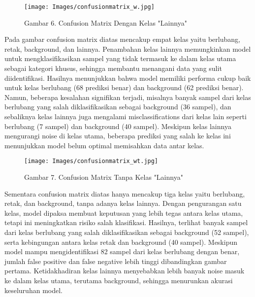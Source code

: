 \documentclass[12pt,a4paper]{article}
\begin{document}
\begin{figure}[h]
    \centering
    \texttt{[image: Images/confusionmatrix\_w.jpg]}
    \caption*{Gambar 6. Confusion Matrix Dengan Kelas "Lainnya"}
    \label{fig:enter-label}
\end{figure}
\begin{adjustwidth}{3em}{0pt}
\hspace{0.5cm} Pada gambar confusion matrix diatas mencakup empat kelas yaitu berlubang, retak, background, dan lainnya. Penambahan kelas lainnya memungkinkan model untuk mengklasifikasikan sampel yang tidak termasuk ke dalam kelas utama sebagai kategori khusus, sehingga membantu menangani data yang sulit diidentifikasi. Hasilnya menunjukkan bahwa model memiliki performa cukup baik untuk kelas berlubang (68 prediksi benar) dan background (62 prediksi benar). Namun, beberapa kesalahan signifikan terjadi, misalnya banyak sampel dari kelas berlubang yang salah diklasifikasikan sebagai background (36 sampel), dan sebaliknya kelas lainnya juga mengalami misclassifications dari kelas lain seperti berlubang (7 sampel) dan background (40 sampel). Meskipun kelas lainnya mengurangi noise di kelas utama, beberapa prediksi yang salah ke kelas ini menunjukkan model belum optimal memisahkan data antar kelas.
\end{adjustwidth}

\begin{figure}[h]
    \centering
    \texttt{[image: Images/confusionmatrix\_wt.jpg]}
    \caption*{Gambar 7. Confusion Matrix Tanpa Kelas "Lainnya"}
    \label{fig:enter-label}
\end{figure}
\begin{adjustwidth}{3em}{0pt}
\hspace{0.5cm} Sementara confusion matrix diatas hanya mencakup tiga kelas yaitu berlubang, retak, dan background, tanpa adanya kelas lainnya. Dengan pengurangan satu kelas, model dipaksa membuat keputusan yang lebih tegas antara kelas utama, tetapi ini meningkatkan risiko salah klasifikasi. Hasilnya, terlihat banyak sampel dari kelas berlubang yang salah diklasifikasikan sebagai background (52 sampel), serta kebingungan antara kelas retak dan background (40 sampel). Meskipun model mampu mengidentifikasi 82 sampel dari kelas berlubang dengan benar, jumlah false positive dan false negative lebih tinggi dibandingkan gambar pertama. Ketidakhadiran kelas lainnya menyebabkan lebih banyak noise masuk ke dalam kelas utama, terutama background, sehingga menurunkan akurasi keseluruhan model.
\end{adjustwidth}
\end{document}
